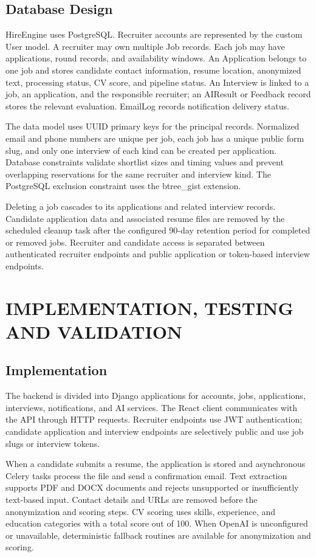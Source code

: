 \section{Database Design}
HireEngine uses PostgreSQL. Recruiter accounts are represented by the custom User model. A recruiter may own multiple Job records. Each job may have applications, round records, and availability windows. An Application belongs to one job and stores candidate contact information, resume location, anonymized text, processing status, CV score, and pipeline status. An Interview is linked to a job, an application, and the responsible recruiter; an AIResult or Feedback record stores the relevant evaluation. EmailLog records notification delivery status.

The data model uses UUID primary keys for the principal records. Normalized email and phone numbers are unique per job, each job has a unique public form slug, and only one interview of each kind can be created per application. Database constraints validate shortlist sizes and timing values and prevent overlapping reservations for the same recruiter and interview kind. The PostgreSQL exclusion constraint uses the btree\_gist extension.

Deleting a job cascades to its applications and related interview records. Candidate application data and associated resume files are removed by the scheduled cleanup task after the configured 90-day retention period for completed or removed jobs. Recruiter and candidate access is separated between authenticated recruiter endpoints and public application or token-based interview endpoints.
%
%
%
%
\chapter{IMPLEMENTATION, TESTING AND VALIDATION}
%
\section{Implementation}
The backend is divided into Django applications for accounts, jobs, applications, interviews, notifications, and AI services. The React client communicates with the API through HTTP requests. Recruiter endpoints use JWT authentication; candidate application and interview endpoints are selectively public and use job slugs or interview tokens.

When a candidate submits a resume, the application is stored and asynchronous Celery tasks process the file and send a confirmation email. Text extraction supports PDF and DOCX documents and rejects unsupported or insufficiently text-based input. Contact details and URLs are removed before the anonymization and scoring steps. CV scoring uses skills, experience, and education categories with a total score out of 100. When OpenAI is unconfigured or unavailable, deterministic fallback routines are available for anonymization and scoring.

